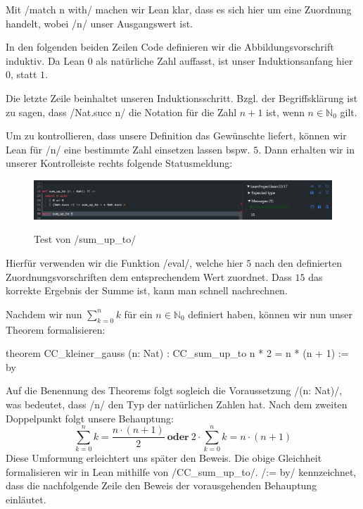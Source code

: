 \documentclass[10pt]{article}
\begin{document}
\noindent Mit \lean/match n with/ machen wir Lean klar, dass es sich hier um eine Zuordnung handelt, wobei \lean/n/ unser Ausgangswert ist.\par

\noindent In den folgenden beiden Zeilen Code definieren wir die Abbildungsvorschrift induktiv. Da Lean $0$ als natürliche Zahl auffasst, ist unser Induktionsanfang hier $0$, statt $1$.\par

\noindent Die letzte Zeile beinhaltet unseren Induktionsschritt. Bzgl. der Begriffsklärung ist zu sagen, dass \lean/Nat.succ n/ die Notation für die Zahl $n+1$ ist, wenn $n\in \mathbb{N}_0$ gilt.

\noindent Um zu kontrollieren, dass unsere Definition das Gewünschte liefert, können wir Lean für \lean/n/ eine bestimmte Zahl einsetzen lassen bspw. $5$. Dann erhalten wir in unserer Kontrolleiste rechts folgende Statusmeldung:
\begin{figure}[H]
    \centering
    \includegraphics[scale=0.5]{sum_up_to 5.png}
    \label{Abb2}
    \caption{Test von \lean/sum_up_to/}
    
\end{figure}
\noindent Hierfür verwenden wir die Funktion \lean/eval/, welche hier $5$ nach den definierten Zuordnungsvorschriften dem entsprechendem Wert zuordnet. Dass $15$ das korrekte Ergebnis der Summe ist, kann man schnell nachrechnen.

\noindent Nachdem wir nun $\sum_{k=0}^{n}k$ für ein $n\in \mathbb{N}_0$ definiert haben, können wir nun unser Theorem formalisieren:
\begin{leancode}
theorem CC_kleiner_gauss (n: Nat) : CC_sum_up_to n * 2 = n * (n + 1) := by
\end{leancode}
Auf die Benennung des Theorems folgt sogleich die Voraussetzung \lean/(n: Nat)/, was bedeutet, dass \lean/n/ den Typ der natürlichen Zahlen hat. Nach dem zweiten Doppelpunkt folgt unsere Behauptung: $$\sum_{k=0}^{n}k=\frac{n\cdot (n+1)}{2} 
~\textbf{oder}~2\cdot\sum_{k=0}^{n}k=n\cdot (n+1)$$
\noindent Diese Umformung erleichtert uns später den Beweis. Die obige Gleichheit formalisieren wir in Lean mithilfe von \lean/CC_sum_up_to/. \lean/:= by/ kennzeichnet, dass die nachfolgende Zeile den Beweis der vorausgehenden Behauptung einläutet.
\end{document}
